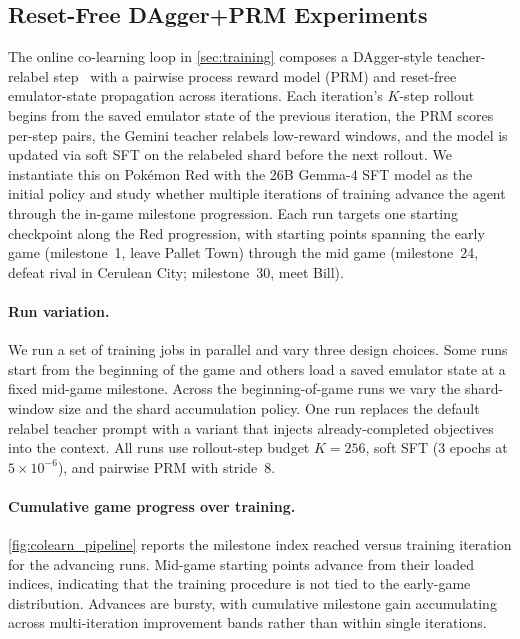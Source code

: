 \documentclass[11pt]{article}
\begin{document}
\subsection{Reset-Free DAgger+PRM Experiments}\label{app:training:dagger_resetfree}

The online co-learning loop in \cref{sec:training} composes a DAgger-style teacher-relabel step~\citep{ross2011reduction,karten2026smallexperts} with a pairwise process reward model (PRM) and reset-free emulator-state propagation across iterations. Each iteration's $K$-step rollout begins from the saved emulator state of the previous iteration, the PRM scores per-step pairs, the Gemini teacher relabels low-reward windows, and the model is updated via soft SFT on the relabeled shard before the next rollout. We instantiate this on Pok\'emon Red with the 26B Gemma-4 SFT model as the initial policy and study whether multiple iterations of training advance the agent through the in-game milestone progression. Each run targets one starting checkpoint along the Red progression, with starting points spanning the early game (milestone~1, leave Pallet Town) through the mid game (milestone~24, defeat rival in Cerulean City; milestone~30, meet Bill).

\paragraph{Run variation.} We run a set of training jobs in parallel and vary three design choices. Some runs start from the beginning of the game and others load a saved emulator state at a fixed mid-game milestone. Across the beginning-of-game runs we vary the shard-window size and the shard accumulation policy. One run replaces the default relabel teacher prompt with a variant that injects already-completed objectives into the context. All runs use rollout-step budget $K{=}256$, soft SFT (3 epochs at $5{\times}10^{-6}$), and pairwise PRM with stride~8.

\paragraph{Cumulative game progress over training.} \cref{fig:colearn_pipeline} reports the milestone index reached versus training iteration for the advancing runs. Mid-game starting points advance from their loaded indices, indicating that the training procedure is not tied to the early-game distribution. Advances are bursty, with cumulative milestone gain accumulating across multi-iteration improvement bands rather than within single iterations.
\end{document}

